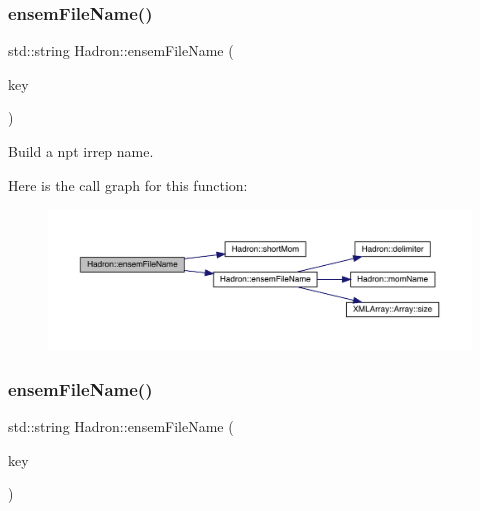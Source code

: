 \subsubsection{\texorpdfstring{ensemFileName()}{ensemFileName()}\hspace{0.1cm}{\footnotesize\ttfamily [10/12]}}
{\footnotesize\ttfamily std\+::string Hadron\+::ensem\+File\+Name (\begin{DoxyParamCaption}\item[{const \mbox{\hyperlink{structHadron_1_1KeyHadronSUNNPartIrrep__t}{Key\+Hadron\+S\+U\+N\+N\+Part\+Irrep\+\_\+t}} \&}]{key }\end{DoxyParamCaption})}



Build a npt irrep name. 

Here is the call graph for this function\+:
\nopagebreak
\begin{figure}[H]
\begin{center}
\leavevmode
\includegraphics[width=350pt]{d1/daf/namespaceHadron_a45ea107463dbd2ccf4ceae63b851f861_cgraph}
\end{center}
\end{figure}
\mbox{\label{namespaceHadron_aa7a6f1af8bf69b8a63890e92bfaaf738}} 
\subsubsection{\texorpdfstring{ensemFileName()}{ensemFileName()}\hspace{0.1cm}{\footnotesize\ttfamily [11/12]}}
{\footnotesize\ttfamily std\+::string Hadron\+::ensem\+File\+Name (\begin{DoxyParamCaption}\item[{const \mbox{\hyperlink{structHadron_1_1KeyHadronSUNNPartNPtCorr__t_1_1NPoint__t}{Hadron\+::\+Key\+Hadron\+S\+U\+N\+N\+Part\+N\+Pt\+Corr\+\_\+t\+::\+N\+Point\+\_\+t}} \&}]{key }\end{DoxyParamCaption})}

